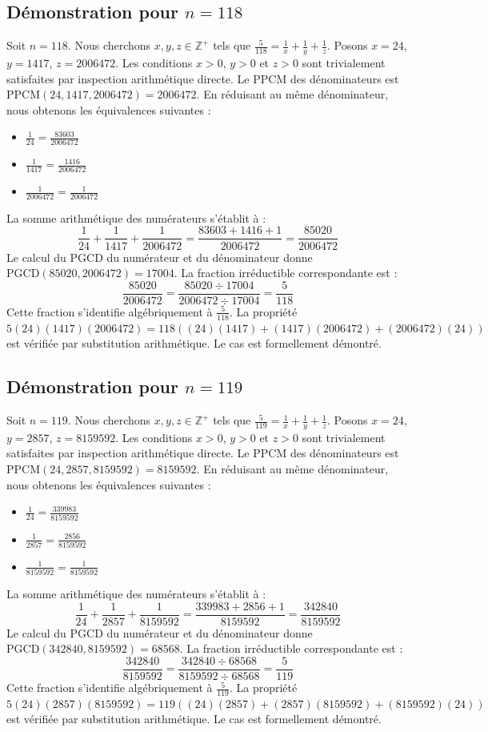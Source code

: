 \documentclass[12pt,a4paper]{article}
\begin{document}
\subsection{Démonstration pour $n = 118$}
Soit $n = 118$. Nous cherchons $x, y, z \in \mathbb{Z}^{+}$ tels que $\frac{5}{118} = \frac{1}{x} + \frac{1}{y} + \frac{1}{z}$.
Posons $x = 24$, $y = 1417$, $z = 2006472$.
Les conditions $x > 0$, $y > 0$ et $z > 0$ sont trivialement satisfaites par inspection arithmétique directe.
Le PPCM des dénominateurs est $\text{PPCM}(24, 1417, 2006472) = 2006472$.
En réduisant au même dénominateur, nous obtenons les équivalences suivantes :
\begin{itemize}
    \item $\frac{1}{24} = \frac{83603}{2006472}$
    \item $\frac{1}{1417} = \frac{1416}{2006472}$
    \item $\frac{1}{2006472} = \frac{1}{2006472}$
\end{itemize}
La somme arithmétique des numérateurs s'établit à :
$$ \frac{1}{24} + \frac{1}{1417} + \frac{1}{2006472} = \frac{83603 + 1416 + 1}{2006472} = \frac{85020}{2006472} $$
Le calcul du PGCD du numérateur et du dénominateur donne $\text{PGCD}(85020, 2006472) = 17004$.
La fraction irréductible correspondante est :
$$ \frac{85020}{2006472} = \frac{85020 \div 17004}{2006472 \div 17004} = \frac{5}{118} $$
Cette fraction s'identifie algébriquement à $\frac{5}{118}$.
La propriété $5(24)(1417)(2006472) = 118((24)(1417) + (1417)(2006472) + (2006472)(24))$ est vérifiée par substitution arithmétique.
Le cas est formellement démontré.

\subsection{Démonstration pour $n = 119$}
Soit $n = 119$. Nous cherchons $x, y, z \in \mathbb{Z}^{+}$ tels que $\frac{5}{119} = \frac{1}{x} + \frac{1}{y} + \frac{1}{z}$.
Posons $x = 24$, $y = 2857$, $z = 8159592$.
Les conditions $x > 0$, $y > 0$ et $z > 0$ sont trivialement satisfaites par inspection arithmétique directe.
Le PPCM des dénominateurs est $\text{PPCM}(24, 2857, 8159592) = 8159592$.
En réduisant au même dénominateur, nous obtenons les équivalences suivantes :
\begin{itemize}
    \item $\frac{1}{24} = \frac{339983}{8159592}$
    \item $\frac{1}{2857} = \frac{2856}{8159592}$
    \item $\frac{1}{8159592} = \frac{1}{8159592}$
\end{itemize}
La somme arithmétique des numérateurs s'établit à :
$$ \frac{1}{24} + \frac{1}{2857} + \frac{1}{8159592} = \frac{339983 + 2856 + 1}{8159592} = \frac{342840}{8159592} $$
Le calcul du PGCD du numérateur et du dénominateur donne $\text{PGCD}(342840, 8159592) = 68568$.
La fraction irréductible correspondante est :
$$ \frac{342840}{8159592} = \frac{342840 \div 68568}{8159592 \div 68568} = \frac{5}{119} $$
Cette fraction s'identifie algébriquement à $\frac{5}{119}$.
La propriété $5(24)(2857)(8159592) = 119((24)(2857) + (2857)(8159592) + (8159592)(24))$ est vérifiée par substitution arithmétique.
Le cas est formellement démontré.
\end{document}
